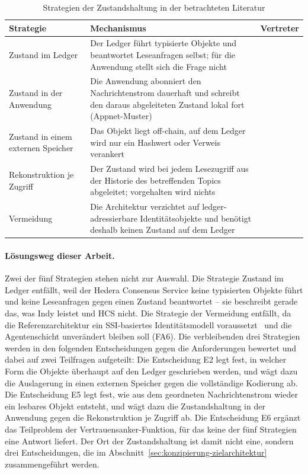 \begin{table}[htbp]
\renewcommand{\arraystretch}{1.3}
\footnotesize
  \centering
  \caption{Strategien der Zustandshaltung in der betrachteten Literatur}
  \label{tab:zustandsstrategien}
  \begin{tabular}{p{} p{} p{}}
    \toprule
    \textbf{Strategie} & \textbf{Mechanismus} & \textbf{Vertreter} \\
    \midrule
    Zustand im Ledger & Der Ledger führt typisierte Objekte und beantwortet Leseanfragen selbst; für die Anwendung stellt sich die Frage nicht & \cite{torongo2023, manoj2022, tawfik2025, joshimahajan2025} \\
    Zustand in der Anwendung & Die Anwendung abonniert den Nachrichtenstrom dauerhaft und schreibt den daraus abgeleiteten Zustand lokal fort (Appnet-Muster) & \cite{bairdgross2019} \\
    Zustand in einem externen Speicher & Das Objekt liegt off-chain, auf dem Ledger wird nur ein Hashwert oder Verweis verankert & \cite{mazlan2020, farin2025, tawfik2025, mamoru2026, guptaverma2026} \\
    Rekonstruktion je Zugriff & Der Zustand wird bei jedem Lesezugriff aus der Historie des betreffenden Topics abgeleitet; vorgehalten wird nichts & \cite{hasheddidmethod, satybaldy2026} \\
    Vermeidung & Die Architektur verzichtet auf ledger-adressierbare Identitätsobjekte und benötigt deshalb keinen Zustand auf dem Ledger & \cite{verma2024} \\
    \bottomrule
  \end{tabular}
\end{table}

\paragraph{Lösungsweg dieser Arbeit.}
Zwei der fünf Strategien stehen nicht zur Auswahl. Die Strategie Zustand im Ledger entfällt, weil der Hedera Consensus Service keine typisierten Objekte führt und keine Leseanfragen gegen einen Zustand beantwortet -- sie beschreibt gerade das, was Indy leistet und HCS nicht. Die Strategie der Vermeidung entfällt, da die Referenzarchitektur ein SSI-basiertes Identitätsmodell voraussetzt~\cite{erler2023} und die Agentenschicht unverändert bleiben soll (FA6). Die verbleibenden drei Strategien werden in den folgenden Entscheidungen gegen die Anforderungen bewertet und dabei auf zwei Teilfragen aufgeteilt: Die Entscheidung E2 legt fest, in welcher Form die Objekte überhaupt auf den Ledger geschrieben werden, und wägt dazu die Auslagerung in einen externen Speicher gegen die vollständige Kodierung ab. Die Entscheidung E5 legt fest, wie aus dem geordneten Nachrichtenstrom wieder ein lesbares Objekt entsteht, und wägt dazu die Zustandshaltung in der Anwendung gegen die Rekonstruktion je Zugriff ab. Die Entscheidung E6 ergänzt das Teilproblem der Vertrauensanker-Funktion, für das keine der fünf Strategien eine Antwort liefert. Der Ort der Zustandshaltung ist damit nicht eine, sondern drei Entscheidungen, die im Abschnitt~\ref{sec:konzipierung-zielarchitektur} zusammengeführt werden.

